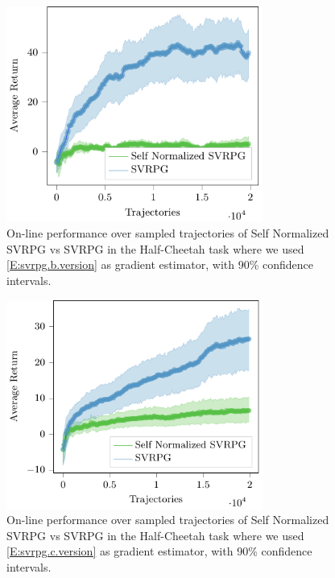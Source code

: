 \begin{figure}[h]
	\begin{minipage}[h]{1\textwidth}
		\centering
		\includegraphics[width=0.75\textwidth]{Images/Experiments/swimmer_SVRPG_vs_sn_SVRPG_B.pdf}
		\vspace{-0.1in}
		\caption{On-line performance over sampled trajectories of Self Normalized \acs{SVRPG} vs \acs{SVRPG} in the Half-Cheetah task where we used \ref{E:svrpg.b.version} as gradient estimator, with 90\% confidence intervals.}
		\label{fig:swimmernine}
	\end{minipage}
	\vspace{-0.15in}
\end{figure}
\begin{figure}[h]
	\begin{minipage}[h]{1\textwidth}
		\centering
		\includegraphics[width=0.75\textwidth]{Images/Experiments/swimmer_SVRPG_vs_sn_SVRPG_C.pdf}
		\vspace{-0.1in}
		\caption{On-line performance over sampled trajectories of Self Normalized \acs{SVRPG} vs \acs{SVRPG} in the Half-Cheetah task where we used \ref{E:svrpg.c.version} as gradient estimator, with 90\% confidence intervals.}
		\label{fig:swimmerten}
	\end{minipage}
	\vspace{-0.15in}
\end{figure}

